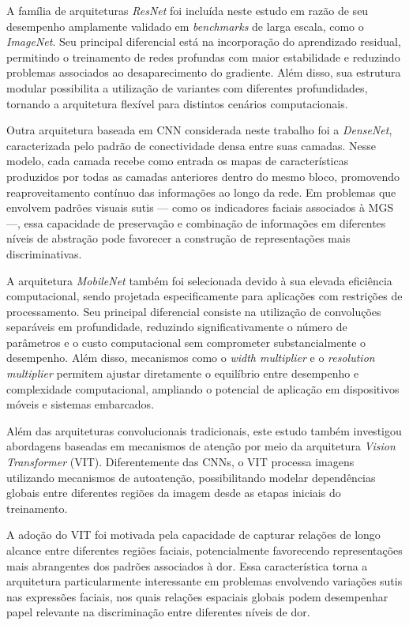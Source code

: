 A família de arquiteturas \textit{ResNet} foi incluída neste estudo em razão de seu desempenho amplamente validado em \textit{benchmarks} de larga escala, como o \textit{ImageNet}. Seu principal diferencial está na incorporação do aprendizado residual, permitindo o treinamento de redes profundas com maior estabilidade e reduzindo problemas associados ao desaparecimento do gradiente. Além disso, sua estrutura modular possibilita a utilização de variantes com diferentes profundidades, tornando a arquitetura flexível para distintos cenários computacionais.

Outra arquitetura baseada em \acs{CNN} considerada neste trabalho foi a \textit{DenseNet}, caracterizada pelo padrão de conectividade densa entre suas camadas. Nesse modelo, cada camada recebe como entrada os mapas de características produzidos por todas as camadas anteriores dentro do mesmo bloco, promovendo reaproveitamento contínuo das informações ao longo da rede. Em problemas que envolvem padrões visuais sutis — como os indicadores faciais associados à \acs{MGS} —, essa capacidade de preservação e combinação de informações em diferentes níveis de abstração pode favorecer a construção de representações mais discriminativas.

A arquitetura \textit{MobileNet} também foi selecionada devido à sua elevada eficiência computacional, sendo projetada especificamente para aplicações com restrições de processamento. Seu principal diferencial consiste na utilização de convoluções separáveis em profundidade, reduzindo significativamente o número de parâmetros e o custo computacional sem comprometer substancialmente o desempenho. Além disso, mecanismos como o \textit{width multiplier} e o \textit{resolution multiplier} permitem ajustar diretamente o equilíbrio entre desempenho e complexidade computacional, ampliando o potencial de aplicação em dispositivos móveis e sistemas embarcados.

Além das arquiteturas convolucionais tradicionais, este estudo também investigou abordagens baseadas em mecanismos de atenção por meio da arquitetura \textit{Vision Transformer} (\acs{VIT}). Diferentemente das \acsp{CNN}, o \acs{VIT} processa imagens utilizando mecanismos de autoatenção, possibilitando modelar dependências globais entre diferentes regiões da imagem desde as etapas iniciais do treinamento.

A adoção do \acs{VIT} foi motivada pela capacidade de capturar relações de longo alcance entre diferentes regiões faciais, potencialmente favorecendo representações mais abrangentes dos padrões associados à dor. Essa característica torna a arquitetura particularmente interessante em problemas envolvendo variações sutis nas expressões faciais, nos quais relações espaciais globais podem desempenhar papel relevante na discriminação entre diferentes níveis de dor.

